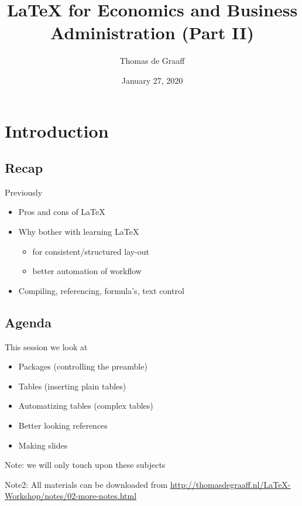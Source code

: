 \documentclass[ignorenonframetext]{beamer}
\title{\LaTeX{} for Economics and Business Administration (Part II)}
\author{Thomas de Graaff}
\date{January 27, 2020}
\begin{document}
\frame{\titlepage}

\section{Introduction}\label{introduction}

\subsection{Recap}\label{introduction-1}

\begin{frame}{Previously}
	\begin{itemize}
		\item Pros and cons of \LaTeX{}
		\newline
		\item Why bother with learning \LaTeX{}
		\begin{itemize}
			\item for consistent/structured lay-out
			\item better automation of workflow
			\newline
		\end{itemize}
		\item Compiling, referencing, formula's, text control
	\end{itemize}
\end{frame}

\subsection{Agenda}

\begin{frame}{This session we look at}
\begin{itemize}
	\item Packages (controlling the preamble)
	\item Tables (inserting plain tables)
	\item Automatizing tables (complex tables)
	\item Better looking references
	\item Making slides
\end{itemize}
	Note: we will only touch upon these subjects
	
	Note2: All materials can be downloaded from \href{http://thomasdegraaff.nl/LaTeX-Workshop/notes/02-more-notes.html}{http://thomasdegraaff.nl/LaTeX-Workshop/notes/02-more-notes.html}
\end{frame}
\end{document}
